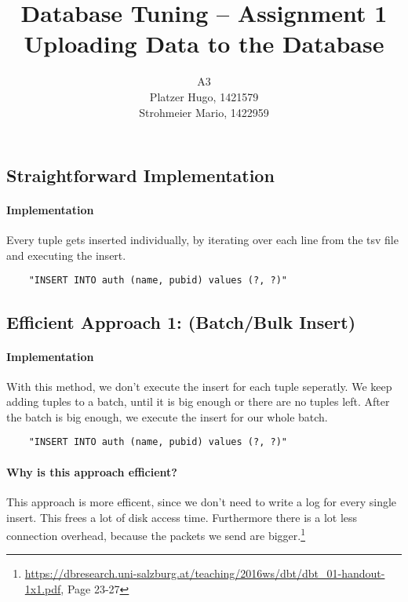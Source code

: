 \documentclass[11pt]{scrartcl}
\title{
  \textbf{\large Database Tuning -- Assignment 1}\\
  Uploading Data to the Database
}
\author{
 A3\\
 \large Platzer Hugo, 1421579 \\
 \large Strohmeier Mario, 1422959 \\
}
\begin{document}
\maketitle

\subsection*{Straightforward Implementation}

  \paragraph{Implementation}

  Every tuple gets inserted individually, by iterating over each line from the tsv file and executing the insert.

{\small
\begin{verbatim}
    "INSERT INTO auth (name, pubid) values (?, ?)"
\end{verbatim}
}

  \subsection*{Efficient Approach 1: (Batch/Bulk Insert)}

  \paragraph{Implementation}

  With this method, we don't execute the insert for each tuple seperatly. We keep adding tuples to a batch, until it is big enough or there are no tuples left. After the batch is big enough, we execute the insert for our whole batch.


{\small
\begin{verbatim}
    "INSERT INTO auth (name, pubid) values (?, ?)"
\end{verbatim}
}

  \paragraph{Why is this approach efficient?}

  This approach is more efficent, since we don't need to write a log for every single insert. This frees a lot of disk access time. Furthermore there is a lot less connection overhead, because the packets we send are bigger.\footnote{\url{https://dbresearch.uni-salzburg.at/teaching/2016ws/dbt/dbt_01-handout-1x1.pdf}, Page 23-27}
\end{document}

